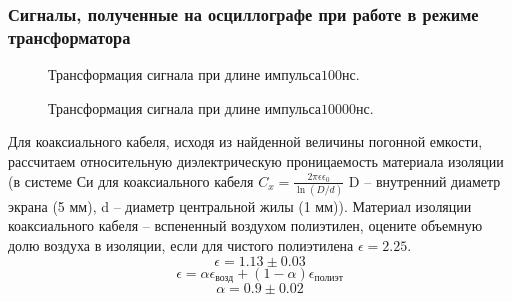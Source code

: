 \documentclass[12pt]{article}
\begin{document}
\begin{flushleft}
\subsubsection{Сигналы, полученные на осциллографе при работе в режиме трансформатора}
\begin{figure}[!h]
\caption{Трансформация сигнала при длине импульса$100$нс.}
\label{ris:image}
\end{figure}
\begin{figure}[!h]
\caption{Трансформация сигнала при длине импульса$10000$нс.}
\label{ris:image}
\end{figure}
\newpage
Для коаксиального кабеля, исходя из найденной величины погонной емкости, рассчитаем относительную диэлектрическую проницаемость материала изоляции (в системе Си для коаксиального кабеля $C_x = \frac{2\pi \epsilon \epsilon_0}{\ln(D/d)}$ D – внутренний диаметр экрана (5 мм), d – диаметр центральной жилы (1 мм)). Материал изоляции коаксиального кабеля – вспененный воздухом полиэтилен, оцените объемную долю воздуха в изоляции, если для чистого полиэтилена $\epsilon = 2.25$.
\[
\epsilon = 1.13 \pm 0.03 
\]
\[\epsilon = \alpha \epsilon_{\text{возд}} + (1-\alpha) \epsilon_{\text{полиэт}} \]
\[\alpha = 0.9 \pm 0.02\]

\end{flushleft}
\end{document}
